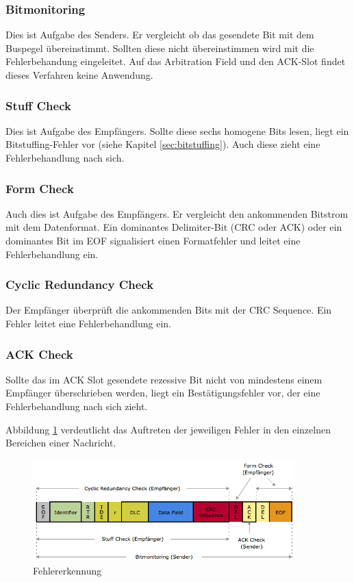 \subsubsection{Bitmonitoring}

Dies ist Aufgabe des Senders. Er vergleicht ob das gesendete Bit mit dem Buspegel übereinstimmt. 
Sollten diese nicht übereinstimmen wird mit die Fehlerbehandung eingeleitet. Auf das Arbitration Field 
und den ACK-Slot findet dieses Verfahren keine Anwendung.

\subsubsection{Stuff Check}

Dies ist Aufgabe des Empfängers. Sollte diese sechs homogene Bits lesen, liegt ein Bitstuffing-Fehler 
vor (siehe Kapitel \ref{sec:bitstuffing}). Auch diese zieht eine Fehlerbehandlung nach sich.

\subsubsection{Form Check}

Auch dies ist Aufgabe des Empfängers. Er vergleicht den ankommenden Bitstrom mit dem Datenformat.
Ein dominantes Delimiter-Bit (CRC oder ACK) oder ein dominantes Bit im EOF signalisiert einen 
Formatfehler und leitet eine Fehlerbehandlung ein.

\subsubsection{Cyclic Redundancy Check}

Der Empfänger überprüft die ankommenden Bits mit der CRC Sequence. Ein Fehler leitet eine 
Fehlerbehandlung ein.

\subsubsection{ACK Check}
	
Sollte das im ACK Slot gesendete rezessive Bit nicht von mindestens einem Empfänger überschrieben 
werden, liegt ein Bestätigungsfehler vor, der eine Fehlerbehandlung nach sich zieht.

Abbildung \ref{pic:errcheck} verdeutlicht das Auftreten der jeweiligen Fehler in den einzelnen Bereichen
einer Nachricht.

\begin{figure}[h] 
\centering
\includegraphics[width=0.9\textwidth]{figures/errcheck}
\caption{Fehlererkennung \citep{VEC}} 
\label{pic:errcheck}
\end{figure} 

